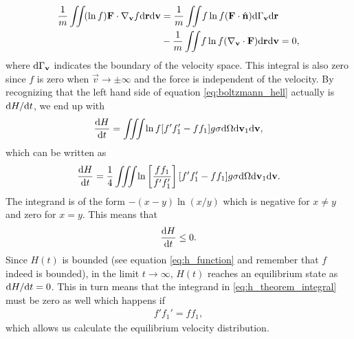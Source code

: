 \begin{align}
	\nonumber
	\frac{1}{m}\iint\! (\ln f) \mathbf F\cdot \nabla_\mathbf v f \mathrm{d}\mathbf r\mathrm{d}\mathbf v &= \frac{1}{m}\iint\! f\ln f (\mathbf F\cdot \hat{\mathbf n})\mathrm{d}\Gamma_\mathbf v\mathrm{d}\mathbf r\\
	&- \frac{1}{m}\iint\! f\ln f (\nabla_\mathbf v \cdot \mathbf F)\mathrm{d}\mathbf r\mathrm{d}\mathbf v = 0,
\end{align}
where $\mathrm{d}\Gamma_\mathbf v$ indicates the boundary of the velocity space. This integral is also zero since $f$ is zero when $\vec v\rightarrow \pm \infty$ and the force is independent of the velocity. By recognizing that the left hand side of equation \eqref{eq:boltzmann_hell} actually is $\mathrm{d}H/\mathrm{d}t$, we end up with
\begin{align}
 	\frac{\mathrm{d}H}{\mathrm{d}t} = \iiint\! \ln f [f'f_1' - ff_1] g \sigma\mathrm{d}\Omega\mathrm{d}\mathbf v_1 \mathrm{d}\mathbf v,
\end{align}
which can be written as\cite{mcquarrie1973statistical}
\begin{align}
	\label{eq:h_theorem_integral}
 	\frac{\mathrm{d}H}{\mathrm{d}t} = \frac{1}{4}\iiint\! \ln\left[\frac{ff_1}{f'f_1'}\right] [f'f_1' - ff_1]g \sigma \mathrm{d}\Omega\mathrm{d}\mathbf v_1 \mathrm{d}\mathbf v.
\end{align}
The integrand is of the form $-(x-y)\ln(x/y)$ which is negative for $x\neq y$ and zero for $x=y$. This means that
\begin{align}
	\frac{\mathrm{d}H}{\mathrm{d}t} \leq 0.
\end{align}
Since $H(t)$ is bounded (see equation \eqref{eq:h_function} and remember that $f$ indeed is bounded), in the limit $t\rightarrow\infty$, $H(t)$ reaches an equilibrium state as $\mathrm{d}H/\mathrm{d}t = 0$. This in turn means that the integrand in \eqref{eq:h_theorem_integral} must be zero as well which happens if
\begin{align}
	\label{eq:equilibrium_f_relation}
	f'f_1' = ff_1,
\end{align}
which allows us calculate the equilibrium velocity distribution.
